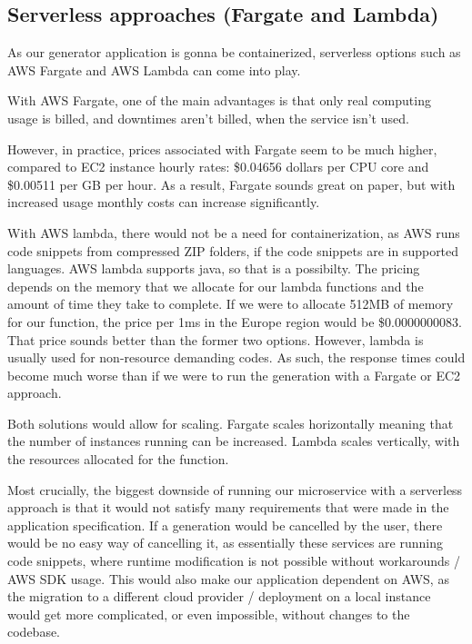 	\subsection{Serverless approaches (Fargate and Lambda)}
		As our generator application is gonna be containerized, serverless options such as AWS Fargate and AWS Lambda can come into play.
		
		With AWS Fargate, one of the main advantages is that only real computing usage is billed, and
		downtimes aren't billed, when the service isn't used. 

		However, in practice, prices associated with Fargate seem to be 
		much higher, compared to EC2 instance hourly rates: \$0.04656 dollars per CPU core and \$0.00511 per GB per hour. As a
		result, Fargate sounds great on paper, but with increased usage monthly costs can increase significantly.

		With AWS lambda, there would not be a need for containerization, as AWS runs code snippets from compressed ZIP folders, if the code 
		snippets are in supported languages. AWS lambda supports java, so that is a possibilty. The pricing depends on the memory that 
		we allocate for our lambda functions and the amount of time they take to complete. If we were to allocate 512MB of memory for 
		our function, the price per 1ms in the Europe region would be \$0.0000000083. That price sounds better than the former two options. 
		However, lambda is usually used for non-resource demanding codes. As such, the response times could become much worse than if we 
		were to run the generation with a Fargate or EC2 approach.

		Both solutions would allow for scaling. Fargate scales horizontally meaning that the number of instances running can be increased.
		Lambda scales vertically, with the resources allocated for the function. 

		Most crucially, the biggest downside of running our microservice with a serverless approach is that it would not satisfy many requirements
		that were made in the application specification. If a generation would be cancelled by the user, there would be no easy way of cancelling it, 
		as essentially these services are running code snippets, where runtime modification is not possible without workarounds / AWS SDK usage. This 
		would also make our application dependent on AWS, as the migration to a different cloud provider / deployment on a local instance would get more
		complicated, or even impossible, without changes to the codebase. 

